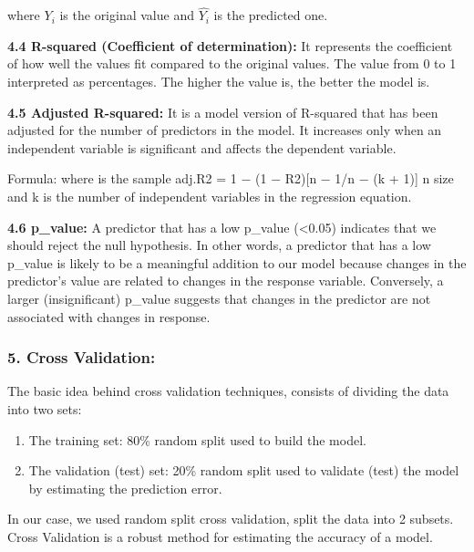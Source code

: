 \documentclass[11pt]{article}
\begin{document}
where \(Y_{i}\) is the original value and \({\hat {Y_{i}}}\) is the
predicted one.

\textbf{4.4 R-squared (Coefficient of determination):} It represents the
coefficient of how well the values fit compared to the original values.
The value from 0 to 1 interpreted as percentages. The higher the value
is, the better the model is.

\textbf{4.5 Adjusted R-squared:} It is a model version of R-squared that
has been adjusted for the number of predictors in the model. It
increases only when an independent variable is significant and affects
the dependent variable.

Formula: where is the sample adj.R2 = 1 − (1 − R2){[}n − 1/n − (k +
1){]} n size and k is the number of independent variables in the
regression equation.

\textbf{4.6 p\_value:} A predictor that has a low p\_value
(\textless{}0.05) indicates that we should reject the null hypothesis.
In other words, a predictor that has a low p\_value is likely to be a
meaningful addition to our model because changes in the predictor's
value are related to changes in the response variable. Conversely, a
larger (insignificant) p\_value suggests that changes in the predictor
are not associated with changes in response.

\hypertarget{cross-validation}{%
\subsubsection{5. Cross Validation:}\label{cross-validation}}

The basic idea behind cross validation techniques, consists of dividing
the data into two sets:

\begin{enumerate}
\def\labelenumi{\alph{enumi}.}
\item
  The training set: 80\% random split used to build the model.
\item
  The validation (test) set: 20\% random split used to validate (test)
  the model by estimating the prediction error.
\end{enumerate}

In our case, we used random split cross validation, split the data into
2 subsets. Cross Validation is a robust method for estimating the
accuracy of a model.


    
    
    
    
\end{document}
